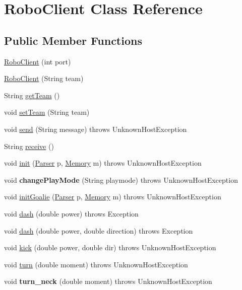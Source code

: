 \hypertarget{classRoboClient}{
\section{RoboClient Class Reference}
\label{classRoboClient}
}
\subsection*{Public Member Functions}
\begin{DoxyCompactItemize}
\item 
\hyperlink{classRoboClient_a4138139e6255c0e81c107b46cfae1857}{RoboClient} (int port)
\item 
\hyperlink{classRoboClient_a3a96c4220b4fb7986a19384f9c26a860}{RoboClient} (String team)
\item 
String \hyperlink{classRoboClient_a8a009213796938c1212717c9432cf23b}{getTeam} ()
\item 
void \hyperlink{classRoboClient_a2fedd2a243028701cafca425adb358cf}{setTeam} (String team)
\item 
void \hyperlink{classRoboClient_a621d84c943cd26b12726dc2c7f21339f}{send} (String message)  throws UnknownHostException
\item 
String \hyperlink{classRoboClient_a696aa2acd96325fe2f2abeacd27ba54c}{receive} ()
\item 
void \hyperlink{classRoboClient_a2be71da337ba3aae4895b23377a7f95c}{init} (\hyperlink{classParser}{Parser} p, \hyperlink{classMemory}{Memory} m)  throws UnknownHostException 
\item 
\hypertarget{classRoboClient_afd1d41a4ba06ce09f31c907345060ee8}{
void {\bfseries changePlayMode} (String playmode)  throws UnknownHostException }
\label{classRoboClient_afd1d41a4ba06ce09f31c907345060ee8}

\item 
void \hyperlink{classRoboClient_ab0286a6a63163a3441dae184ac2638a5}{initGoalie} (\hyperlink{classParser}{Parser} p, \hyperlink{classMemory}{Memory} m)  throws UnknownHostException 
\item 
void \hyperlink{classRoboClient_a5d403310e44e5992d1de9d074006d0ea}{dash} (double power)  throws Exception 
\item 
void \hyperlink{classRoboClient_a6bb560522536e1212a9411ea2e4725e9}{dash} (double power, double direction)  throws Exception 
\item 
void \hyperlink{classRoboClient_afcf4a68e59dd2df04674ce545c3c3dcc}{kick} (double power, double dir)  throws UnknownHostException 
\item 
void \hyperlink{classRoboClient_a41fea7f3f13d507a0e36a0de37a6dcb0}{turn} (double moment)  throws UnknownHostException
\item 
\hypertarget{classRoboClient_a6a880aae7b1d1b58c3e38c8018b4f493}{
void {\bfseries turn\_\-neck} (double moment)  throws UnknownHostException }
\label{classRoboClient_a6a880aae7b1d1b58c3e38c8018b4f493}


\end{DoxyCompactItemize}
